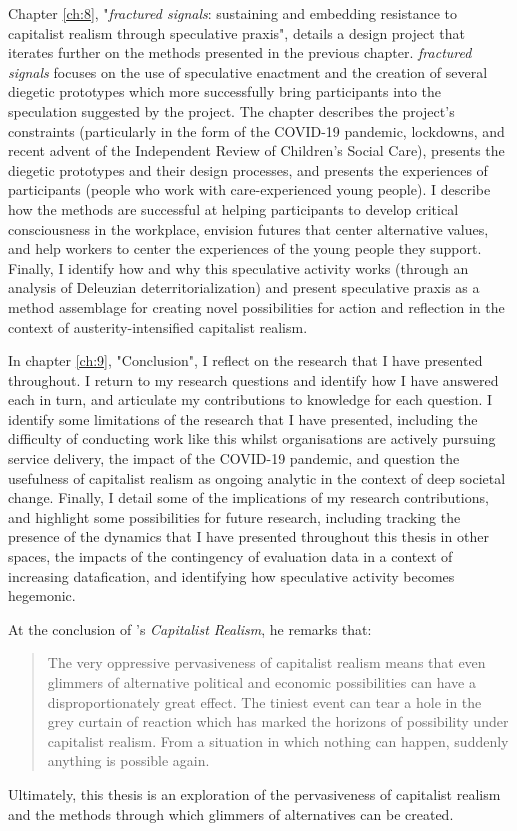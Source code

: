 Chapter \ref{ch:8}, "\textit{fractured signals}: sustaining and embedding resistance to capitalist realism through speculative praxis", details a design project that iterates further on the methods presented in the previous chapter. \textit{fractured signals} focuses on the use of speculative enactment and the creation of several diegetic prototypes which more successfully bring participants into the speculation suggested by the project. The chapter describes the project's constraints (particularly in the form of the COVID-19 pandemic, lockdowns, and recent advent of the Independent Review of Children's Social Care), presents the diegetic prototypes and their design processes, and presents the experiences of participants (people who work with care-experienced young people). I describe how the methods are successful at helping participants to develop critical consciousness in the workplace, envision futures that center alternative values, and help workers to center the experiences of the young people they support. Finally, I identify how and why this speculative activity works (through an analysis of Deleuzian deterritorialization) and present speculative praxis as a method assemblage for creating novel possibilities for action and reflection in the context of austerity-intensified capitalist realism.

In chapter \ref{ch:9}, "Conclusion", I reflect on the research that I have presented throughout. I return to my research questions and identify how I have answered each in turn, and articulate my contributions to knowledge for each question. I identify some limitations of the research that I have presented, including the difficulty of conducting work like this whilst organisations are actively pursuing service delivery, the impact of the COVID-19 pandemic, and question the usefulness of capitalist realism as ongoing analytic in the context of deep societal change. Finally, I detail some of the implications of my research contributions, and highlight some possibilities for future research, including tracking the presence of the dynamics that I have presented throughout this thesis in other spaces, the impacts of the contingency of evaluation data in a context of increasing datafication, and identifying how speculative activity becomes hegemonic. 

At the conclusion of \citet[pp. 80–81]{fisher_capitalist_2009}'s \textit{Capitalist Realism}, he remarks that:
\begin{quote}
The very oppressive pervasiveness of capitalist realism means that even glimmers of alternative political and economic possibilities can have a disproportionately great effect. The tiniest event can tear a hole in the grey curtain of reaction which has marked the horizons of possibility under capitalist realism. From a situation in which nothing can happen, suddenly anything is possible again.
\end{quote}
Ultimately, this thesis is an exploration of the pervasiveness of capitalist realism and the methods through which glimmers of alternatives can be created. 

